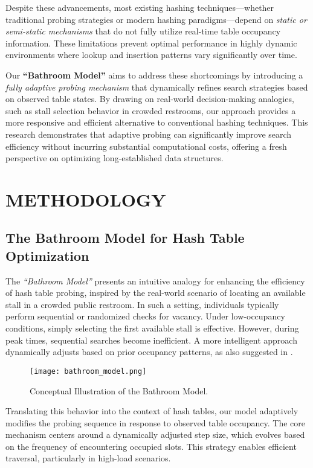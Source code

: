 \documentclass[letterpaper]{article}
\begin{document}
Despite these advancements, most existing hashing techniques—whether traditional probing strategies or modern hashing paradigms—depend on \textit{static or semi-static mechanisms} that do not fully utilize real-time table occupancy information. These limitations prevent optimal performance in highly dynamic environments where lookup and insertion patterns vary significantly over time.

Our \textbf{``Bathroom Model''} aims to address these shortcomings by introducing a \textit{fully adaptive probing mechanism} that dynamically refines search strategies based on observed table states. By drawing on real-world decision-making analogies, such as stall selection behavior in crowded restrooms, our approach provides a more responsive and efficient alternative to conventional hashing techniques. This research demonstrates that adaptive probing can significantly improve search efficiency without incurring substantial computational costs, offering a fresh perspective on optimizing long-established data structures.



\section{METHODOLOGY}

\subsection{The Bathroom Model for Hash Table Optimization}

The \textit{``Bathroom Model''} presents an intuitive analogy for enhancing the efficiency of hash table probing, inspired by the real-world scenario of locating an available stall in a crowded public restroom. In such a setting, individuals typically perform sequential or randomized checks for vacancy. Under low-occupancy conditions, simply selecting the first available stall is effective. However, during peak times, sequential searches become inefficient. A more intelligent approach dynamically adjusts based on prior occupancy patterns, as also suggested in \cite{cormen2009}.

\begin{figure}[ht]
    \centering
    \texttt{[image: bathroom\_model.png]}
    \caption{Conceptual Illustration of the Bathroom Model.}
    \label{fig:bathroom_model}
\end{figure}

Translating this behavior into the context of hash tables, our model adaptively modifies the probing sequence in response to observed table occupancy. The core mechanism centers around a dynamically adjusted step size, which evolves based on the frequency of encountering occupied slots. This strategy enables efficient traversal, particularly in high-load scenarios.
\end{document}
